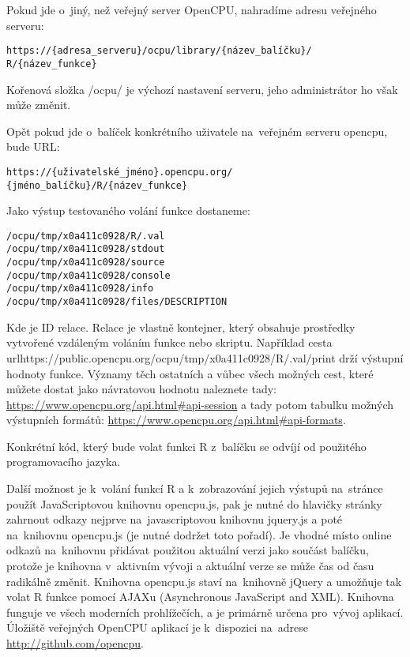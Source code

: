 \documentclass[thesis=B,czech]{FITthesis}[2012/06/26]
\begin{document}
Pokud jde o~jiný, než veřejný server OpenCPU, nahradíme adresu veřejného serveru:

\begin{alltt}
https://\{adresa_serveru\}/ocpu/library/\{název_balíčku\}/
R/\{název_funkce\}
\end{alltt}
 
Kořenová složka /ocpu/ je výchozí nastavení serveru, jeho administrátor ho však může změnit.

Opět pokud jde o~balíček konkrétního uživatele na~veřejném serveru opencpu, bude URL:
\begin{alltt}
https://\{uživatelské_jméno\}.opencpu.org/
\{jméno_balíčku\}/R/\{název_funkce\}
\end{alltt}

Jako výstup testovaného volání funkce dostaneme: 
\begin{alltt}
/ocpu/tmp/x0a411c0928/R/.val
/ocpu/tmp/x0a411c0928/stdout
/ocpu/tmp/x0a411c0928/source
/ocpu/tmp/x0a411c0928/console
/ocpu/tmp/x0a411c0928/info
/ocpu/tmp/x0a411c0928/files/DESCRIPTION
\end{alltt}

Kde  je ID relace. Relace je vlastně kontejner, který obsahuje prostředky vytvořené vzdáleným voláním funkce nebo skriptu. Například cesta url{https://public.opencpu.org/ocpu/tmp/x0a411c0928/R/.val/print} drží výstupní hodnoty funkce. Významy těch ostatních a vůbec všech možných cest, které můžete dostat jako návratovou hodnotu naleznete tady: \url{https://www.opencpu.org/api.html#api-session} a tady potom tabulku možných výstupních formátů: \url{https://www.opencpu.org/api.html#api-formats}.

Konkrétní kód, který bude volat funkci R z~balíčku se odvíjí od použitého programovacího jazyka.

Další možnost je k~volání funkcí R a k~zobrazování jejich výstupů na~stránce použít JavaScriptovou knihovnu opencpu.js, pak je nutné do hlavičky stránky zahrnout odkazy nejprve na~javascriptovou knihovnu jquery.js a poté na~knihovnu opencpu.js (je nutné dodržet toto pořadí). 
Je vhodné místo online odkazů na~knihovnu přidávat použitou aktuální verzi jako součást balíčku, protože je knihovna v~aktivním vývoji a aktuální verze se může čas od času radikálně změnit. Knihovna opencpu.js staví na~knihovně jQuery a umožňuje tak volat R funkce pomocí AJAXu (Asynchronous JavaScript and XML). Knihovna funguje ve všech moderních prohlížečích, a je primárně určena pro~vývoj aplikací. Úložiště veřejných OpenCPU aplikací je k~dispozici na~adrese \url{http://github.com/opencpu}. 
\end{document}
